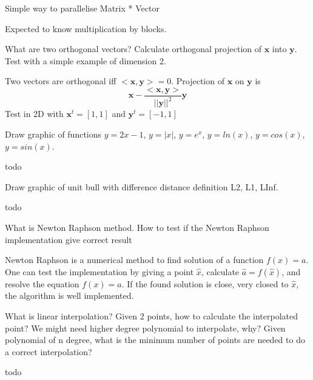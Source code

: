 \documentclass{exam}%
\newcommand{\mathvec}[1]{\textbf{#1}}
\begin{document}
\begin{questions}
\question Simple way to parallelise Matrix * Vector
\begin{solution}[.2in]
Expected to know multiplication by blocks.
\end{solution}

\question What are two orthogonal vectors? Calculate orthogonal projection of $\mathvec{x}$ into $\mathvec{y}$. Test with a simple example of dimension 2. 
\begin{solution}[.2in]
Two vectors are orthogonal iff $<\mathvec{x},\mathvec{y}>=0$. Projection of $\mathvec{x}$ on $\mathvec{y}$ is
\[
\mathvec{x} - \frac{<\mathvec{x},\mathvec{y}>}{||\mathvec{y}||^2} \mathvec{y}
\]
Test in 2D with $\mathvec{x}^t=[1,1]$ and $\mathvec{y}^t=[-1,1]$
\end{solution}

\question Draw graphic of functions $y=2x-1$, $y=|x|$, $y=e^x$, $y=ln(x)$, $y=cos(x)$, $y=sin(x)$.
\begin{solution}[.2in]
	todo
\end{solution}

\question Draw graphic of unit bull with difference distance definition L2, L1, LInf.
\begin{solution}[.2in]
	todo
\end{solution}

\question What is Newton Raphson method. How to test if the Newton Raphson implementation give correct result
\begin{solution}[.2in]
Newton Raphson is a numerical method to find solution of a function $f(x)=a$. One can test the implementation by giving a point $\hat{x}$, calculate $\hat{a}=f(\hat{x})$, and resolve the equation $f(x)=\hat{a}$. If the found solution is close, very closed to $\hat{x}$, the algorithm is well implemented.
\end{solution}

\question What is linear interpolation? Given 2 points, how to calculate the interpolated point? We might need higher degree polynomial to interpolate, why? Given polynomial of n degree, what is the minimum number of points are needed to do a correct interpolation?
\begin{solution}[.2in]
	todo
\end{solution}


\end{questions}
\end{document}
